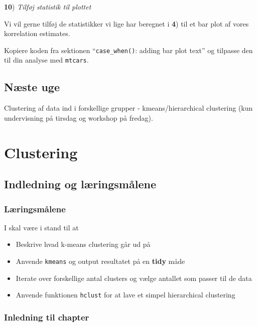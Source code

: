 \documentclass[
]{book}
\providecommand{\tightlist}{%
  \setlength{\itemsep}{0pt}\setlength{\parskip}{0pt}}
\begin{document}
\textbf{10}) \emph{Tilføj statistik til plottet}

Vi vil gerne tilføj de statistikker vi lige har beregnet i \textbf{4}) til et bar plot af vores korrelation estimates.

Kopiere koden fra sektionen ``\texttt{case\_when()}: adding bar plot text'' og tilpasse den til din analyse med \texttt{mtcars}.

\hypertarget{nuxe6ste-uge}{%
\section{Næste uge}\label{nuxe6ste-uge}}

Clustering af data ind i forskellige grupper - kmeans/hierarchical clustering (kun undervisning på tirsdag og workshop på fredag).

\hypertarget{clustering}{%
\chapter{Clustering}\label{clustering}}

\hypertarget{indledning-og-luxe6ringsmuxe5lene-2}{%
\section{Indledning og læringsmålene}\label{indledning-og-luxe6ringsmuxe5lene-2}}

\hypertarget{luxe6ringsmuxe5lene-4}{%
\subsection{Læringsmålene}\label{luxe6ringsmuxe5lene-4}}

I skal være i stand til at

\begin{itemize}
\tightlist
\item
  Beskrive hvad k-means clustering går ud på
\item
  Anvende \texttt{kmeans} og output resultatet på en \textbf{tidy} måde
\item
  Iterate over forskellige antal clusters og vælge antallet som passer til de data
\item
  Anvende funktionen \texttt{hclust} for at lave et simpel hierarchical clustering
\end{itemize}

\hypertarget{inledning-til-chapter}{%
\subsection{Inledning til chapter}\label{inledning-til-chapter}}
\end{document}
